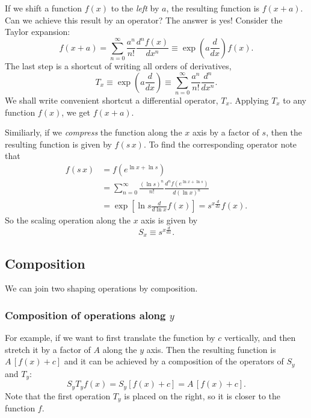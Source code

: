 \documentclass{article}
\begin{document}
If we shift a function $f(x)$ to the \emph{left} by $a$,
the resulting function is $f(x + a)$.
Can we achieve this result by an operator?
The answer is yes!
Consider the Taylor expansion:
$$
f(x + a) = \sum_{n = 0}^\infty \frac{a^n}{n!} \frac{d^n f(x) }{dx^n}
\equiv \exp\left(a \frac{d}{dx} \right) f(x).
$$
The last step is a shortcut of
writing all orders of derivatives,
$$
T_x \equiv
\exp\left(a \frac{d}{dx} \right)
\equiv
\sum_{n = 0}^\infty \frac{a^n}{n!} \frac{d^n }{ dx^n}.
$$
We shall write convenient shortcut
a differential operator, $T_x$.
%
Applying $T_x$ to any function $f(x)$, we get $f(x+a)$.

Similiarly, if we \emph{compress} the function along the $x$ axis by a factor of $s$,
then the resulting function is given by $f(s \, x)$.
To find the corresponding operator note that
$$
\begin{aligned}
f(s \, x)
&= f( e^{\ln x + \ln s} ) \\
&= \sum_{n = 0}^\infty \frac{(\ln s)^n}{n!} \frac{d^n f(e^{\ln x + \ln s}) }{ d(\ln x)^n } \\
&= \exp\left[ \ln s \frac{d}{d\ln x} f(x) \right]
= s^{x \frac{d}{dx} } f(x).
\end{aligned}
$$
So the scaling operation along the $x$ axis is given by
$$
S_x \equiv s^{x \frac{d}{dx} }.
$$



\subsection{Composition}


We can join two shaping operations by composition.


\subsubsection{Composition of operations along $y$}

For example, if we want to first translate the function by $c$ vertically,
and then stretch it by a factor of $A$ along the $y$ axis.
Then the resulting function is $A \, [f(x) + c]$
and it can be achieved by a composition of the operators
of $S_y$ and $T_y$:
\begin{equation}
S_y T_y f(x) = S_y [f(x) + c] = A \, [f(x) + c].
\label{eq:SyTy}
\end{equation}
Note that the first operation $T_y$ is placed on the right,
so it is closer to the function $f$.
\end{document}
